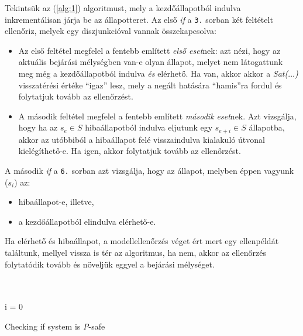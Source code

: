 Tekintsük az (\ref{alg:1}) algoritmust, mely a kezdőállapotból indulva inkrementálisan járja be az állapotteret. Az első \emph{if} a \verb+3.+ sorban két feltételt ellenőriz, melyek egy diszjunkcióval vannak összekapcsolva:
\begin{itemize}
	\item Az első feltétel megfelel a fentebb említett \emph{első eset}nek: azt nézi, hogy az aktuális bejárási mélységben van-e olyan állapot, melyet nem látogattunk meg még a kezdőállapotból indulva \emph{és} elérhető. Ha van, akkor akkor a \emph{Sat($\ldots$)} visszatérési értéke ``igaz'' lesz, mely a negált hatására ``hamis''ra fordul és folytatjuk tovább az ellenőrzést.
	
	\item A második feltétel megfelel a fentebb említett \emph{második eset}nek. Azt vizsgálja, hogy ha az $s_e \in S$ hibaállapotból indulva eljutunk egy $s_{e+i} \in S$ állapotba, akkor az utóbbiból a hibaállapot felé visszaindulva kialakuló útvonal kielégíthető-e. Ha igen, akkor folytatjuk tovább az ellenőrzést.
\end{itemize}
A második \emph{if} a \verb+6.+ sorban azt vizsgálja, hogy az állapot, melyben éppen vagyunk ($s_i$) az:
\begin{itemize}
	\item hibaállapot-e, illetve,
	\item a kezdőállapotból elindulva elérhető-e.
\end{itemize}
Ha elérhető és hibaállapot, a modellellenőrzés véget ért mert egy ellenpéldát találtunk, mellyel vissza is tér az algoritmus, ha nem, akkor az ellenőrzés folytatódik tovább és növeljük eggyel a bejárási mélységet.
\ \\
\ \\
\ \\
\begin{algorithm}[H]
\label{alg:1}

\SetAlgoLined
i = 0 \\
\caption{Checking if system is \emph{P}-safe}
\end{algorithm}

